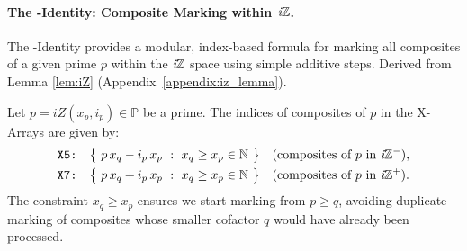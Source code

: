 \documentclass{article}
\begin{document}
\paragraph{The \Xp-Identity: Composite Marking within $\textit{i}\mathbb{Z}$.} \label{sec:xp_id}

The \Xp-Identity provides a modular, index-based formula for marking all composites of a given prime $p$ within the $\textit{i}\mathbb{Z}$ space using simple additive steps. Derived from Lemma \ref{lem:iZ} (Appendix~\ref{appendix:iz_lemma}).
\begin{definition}[\Xp-Identity]
    Let $p=iZ(x_p,i_p)\in\mathbb{P}$ be a prime. The indices of composites of $p$ in the X-Arrays are given by:
    \[
    \begin{aligned}
        \texttt{X5:}&\quad \big\{\ p\,x_q - i_p\,x_p\ :\ x_q\ge x_p \in\mathbb{N}\ \big\} \quad\text{(composites of $p$ in $\textit{i}\mathbb{Z}^-$)},\\
        \texttt{X7:}&\quad \big\{\ p\,x_q + i_p\,x_p\ :\ x_q\ge x_p \in\mathbb{N}\ \big\} \quad\text{(composites of $p$ in $\textit{i}\mathbb{Z}^+$)}.
    \end{aligned}
    \]
    The constraint $x_q \ge x_p$ ensures we start marking from $p \ge q$, avoiding duplicate marking of composites whose smaller cofactor $q$ would have already been processed.
\end{definition}
\end{document}
